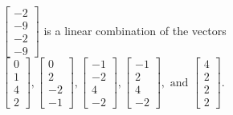 \begin{exercise}
\begin{exerciseStatement}
  \end{exerciseStatement}
  \begin{exerciseAnswer}
   \(\left[\begin{array}{c}
-2 \\
-9 \\
-2 \\
-9
\end{array}\right]\) 
  	 is  
	a linear combination of the vectors \(\left[\begin{array}{c}
0 \\
1 \\
4 \\
2
\end{array}\right] , \left[\begin{array}{c}
0 \\
2 \\
-2 \\
-1
\end{array}\right] , \left[\begin{array}{c}
-1 \\
-2 \\
4 \\
-2
\end{array}\right] , \left[\begin{array}{c}
-1 \\
2 \\
4 \\
-2
\end{array}\right] , \text{ and } \left[\begin{array}{c}
4 \\
2 \\
2 \\
2
\end{array}\right]\).

	
  


  \end{exerciseAnswer}
\end{exercise}